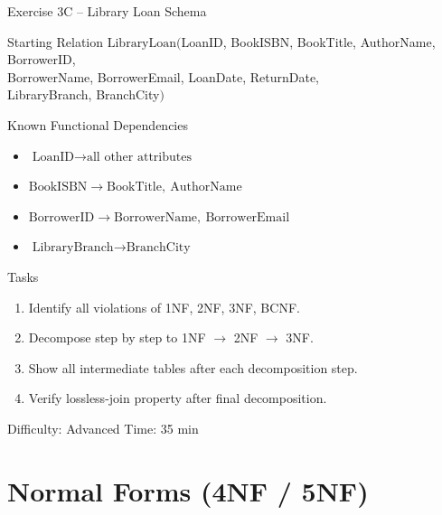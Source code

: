 \documentclass[10pt]{beamer}
\begin{document}
\begin{frame}{Exercise 3C -- Library Loan Schema}
  \begin{block}{Starting Relation}
    $\text{LibraryLoan}($LoanID, BookISBN, BookTitle, AuthorName, BorrowerID,\\
    \hspace{3.0cm} BorrowerName, BorrowerEmail, LoanDate, ReturnDate,\\
    \hspace{3.0cm} LibraryBranch, BranchCity$)$
  \end{block}

  \begin{block}{Known Functional Dependencies}
    \begin{itemize}
      \item $\text{LoanID} \to \text{all other attributes}$
      \item $\text{BookISBN} \to \text{BookTitle},\ \text{AuthorName}$
      \item $\text{BorrowerID} \to \text{BorrowerName},\ \text{BorrowerEmail}$
      \item $\text{LibraryBranch} \to \text{BranchCity}$
    \end{itemize}
  \end{block}

  \begin{block}{Tasks}
    \begin{enumerate}
      \item Identify all violations of 1NF, 2NF, 3NF, BCNF.
      \item Decompose step by step to 1NF $\to$ 2NF $\to$ 3NF.
      \item Show all intermediate tables after each decomposition step.
      \item Verify lossless-join property after final decomposition.
    \end{enumerate}
  \end{block}

  \begin{alertblock}{Difficulty: Advanced \quad Time: 35 min}
  \end{alertblock}
\end{frame}

\section{Normal Forms (4NF / 5NF)}
\end{document}
